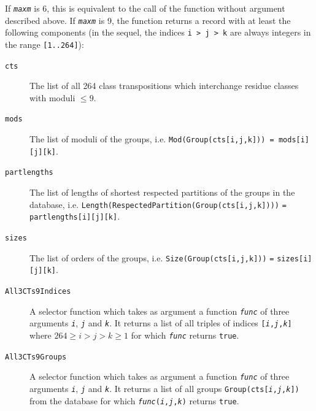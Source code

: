 \documentclass[a4paper,11pt]{report}
\begin{document}
{{{ If \mbox{\texttt{\mdseries\slshape max{\textunderscore}m}} is 6, this is equivalent to the call of the function without argument
described above. If \mbox{\texttt{\mdseries\slshape max{\textunderscore}m}} is 9, the function returns a record with at least the following components (in
the sequel, the indices \texttt{i {\textgreater} j {\textgreater} k} are always integers in the range \texttt{[1..264]}): 
\begin{description}
\item[{\texttt{cts}}]  The list of all 264 class transpositions which interchange residue classes
with moduli $\leq 9$. 
\item[{\texttt{mods}}]  The list of moduli of the groups, i.e. \texttt{Mod(Group(cts\texttt{}[i,j,k]\texttt{})) =
mods[i][j][k]}. 
\item[{\texttt{partlengths}}]  The list of lengths of shortest respected partitions of the groups in the
database, i.e. \texttt{Length(RespectedPartition(Group(cts\texttt{}[i,j,k]\texttt{})))} \texttt{=} \texttt{partlengths[i][j][k]}. 
\item[{\texttt{sizes}}]  The list of orders of the groups, i.e. \texttt{Size(Group(cts\texttt{}[i,j,k]\texttt{}))} \texttt{=} \texttt{sizes[i][j][k]}. 
\item[{\texttt{All3CTs9Indices}}]  A selector function which takes as argument a function \mbox{\texttt{\mdseries\slshape func}} of three arguments \mbox{\texttt{\mdseries\slshape i}}, \mbox{\texttt{\mdseries\slshape j}} and \mbox{\texttt{\mdseries\slshape k}}. It returns a list of all triples of indices \texttt{[\mbox{\texttt{\mdseries\slshape i}},\mbox{\texttt{\mdseries\slshape j}},\mbox{\texttt{\mdseries\slshape k}}]} where $264 \geq i > j > k \geq 1$ for which \mbox{\texttt{\mdseries\slshape func}} returns \texttt{true}. 
\item[{\texttt{All3CTs9Groups}}]  A selector function which takes as argument a function \mbox{\texttt{\mdseries\slshape func}} of three arguments \mbox{\texttt{\mdseries\slshape i}}, \mbox{\texttt{\mdseries\slshape j}} and \mbox{\texttt{\mdseries\slshape k}}. It returns a list of all groups \texttt{Group(cts\texttt{}[\mbox{\texttt{\mdseries\slshape i}},\mbox{\texttt{\mdseries\slshape j}},\mbox{\texttt{\mdseries\slshape k}}]\texttt{})} from the database for which \texttt{\mbox{\texttt{\mdseries\slshape func}}(\mbox{\texttt{\mdseries\slshape i}},\mbox{\texttt{\mdseries\slshape j}},\mbox{\texttt{\mdseries\slshape k}})} returns \texttt{true}. 
\end{description}
 
}}}
\end{document}
